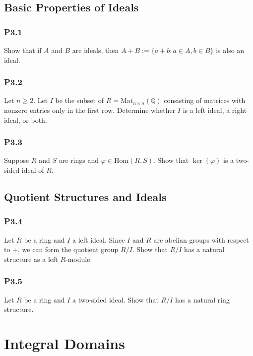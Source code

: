\documentclass[lang=cn,11pt]{template}
\begin{document}
\section{Basic Properties of Ideals}

\subsection*{P3.1} Show that if \( A \) and \( B \) are ideals, then \( A + B := \{ a + b : a \in A, b \in B \} \) is also an ideal.

\subsection*{P3.2} Let \( n \geq 2 \). Let \( I \) be the subset of \( R = \text{Mat}_{n \times n}(\mathbb{Q}) \) consisting of matrices with nonzero entries only in the first row. Determine whether \( I \) is a left ideal, a right ideal, or both.

\subsection*{P3.3} Suppose \( R \) and \( S \) are rings and \( \varphi \in \text{Hom}(R, S) \). Show that \( \ker(\varphi) \) is a two-sided ideal of \( R \).

\section{Quotient Structures and Ideals}

\subsection*{P3.4} Let \( R \) be a ring and \( I \) a left ideal. Since \( I \) and \( R \) are abelian groups with respect to \( + \), we can form the quotient group \( R/I \). Show that \( R/I \) has a natural structure as a left \( R \)-module.

\subsection*{P3.5} Let \( R \) be a ring and \( I \) a two-sided ideal. Show that \( R/I \) has a natural ring structure.









\chapter{Integral Domains}
\end{document}
